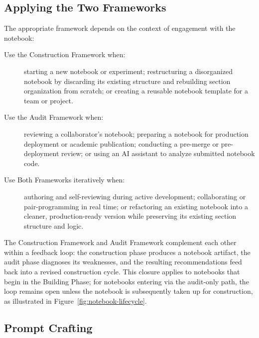 \documentclass[11pt, a4paper]{article}
\begin{document}
\subsection*{Applying the Two Frameworks}

The appropriate framework depends on the context of engagement
with the notebook:

\begin{description}
	
	\item[Use the Construction Framework when:]
	starting a new notebook or experiment; restructuring a disorganized
	notebook by discarding its existing structure and rebuilding section
	organization from scratch; or creating a reusable notebook template
	for a team or project.
	
	\item[Use the Audit Framework when:]
	reviewing a collaborator's notebook; preparing a notebook for
	production deployment or academic publication; conducting a
	pre-merge or pre-deployment review; or using an AI assistant
	to analyze submitted notebook code.
	
	\item[Use Both Frameworks iteratively when:]
	authoring and self-reviewing during active development;
	collaborating or pair-programming in real time; or refactoring
	an existing notebook into a cleaner, production-ready version while
	preserving its existing section structure and logic.
	
\end{description}

\noindent
The Construction Framework and Audit Framework complement each other
within a feedback loop: the construction phase produces a notebook
artifact, the audit phase diagnoses its weaknesses, and the resulting
recommendations feed back into a revised construction cycle. This
closure applies to notebooks that begin in the Building Phase; for
notebooks entering via the audit-only path, the loop remains open
unless the notebook is subsequently taken up for construction, as
illustrated in Figure~\ref{fig:notebook-lifecycle}.

\subsection*{Prompt Crafting}
\end{document}
